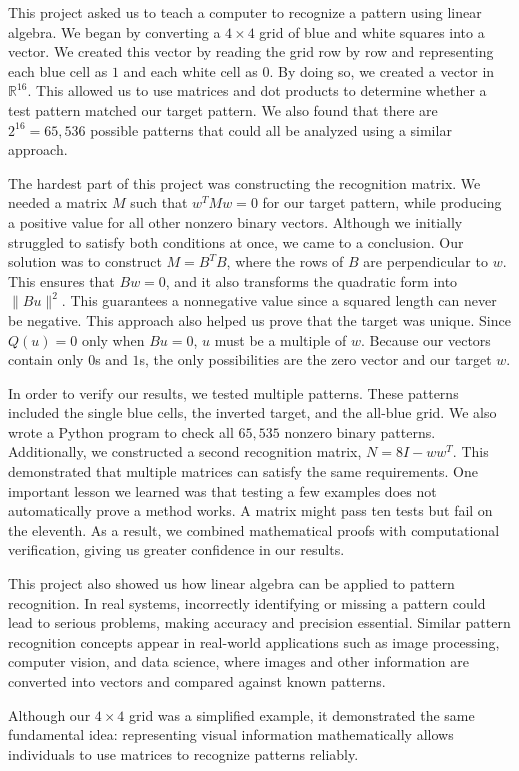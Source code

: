 \documentclass[11pt]{article}
\begin{document}
This project asked us to teach a computer to recognize a pattern using linear algebra. We began by converting a $4\times4$ grid of blue and white squares into a vector. We created this vector by reading the grid row by row and representing each blue cell as $1$ and each white cell as $0$. By doing so, we created a vector in $\mathbb{R}^{16}$. This allowed us to use matrices and dot products to determine whether a test pattern matched our target pattern. We also found that there are $2^{16}=65{,}536$ possible patterns that could all be analyzed using a similar approach.

The hardest part of this project was constructing the recognition matrix. We needed a matrix $M$ such that $w^TMw=0$ for our target pattern, while producing a positive value for all other nonzero binary vectors. Although we initially struggled to satisfy both conditions at once, we came to a conclusion. Our solution was to construct $M=B^TB$, where the rows of $B$ are perpendicular to $w$. This ensures that $Bw=0$, and it also transforms the quadratic form into $\|Bu\|^2$. This guarantees a nonnegative value since a squared length can never be negative. This approach also helped us prove that the target was unique. Since $Q(u)=0$ only when $Bu=0$, $u$ must be a multiple of $w$. Because our vectors contain only $0$s and $1$s, the only possibilities are the zero vector and our target $w$.

In order to verify our results, we tested multiple patterns. These patterns included the single blue cells, the inverted target, and the all-blue grid. We also wrote a Python program to check all $65{,}535$ nonzero binary patterns. Additionally, we constructed a second recognition matrix, $N=8I-ww^T$. This demonstrated that multiple matrices can satisfy the same requirements. One important lesson we learned was that testing a few examples does not automatically prove a method works. A matrix might pass ten tests but fail on the eleventh. As a result, we combined mathematical proofs with computational verification, giving us greater confidence in our results.

This project also showed us how linear algebra can be applied to pattern recognition. In real systems, incorrectly identifying or missing a pattern could lead to serious problems, making accuracy and precision essential. Similar pattern recognition concepts appear in real-world applications such as image processing, computer vision, and data science, where images and other information are converted into vectors and compared against known patterns.

Although our $4\times4$ grid was a simplified example, it demonstrated the same fundamental idea: representing visual information mathematically allows individuals to use matrices to recognize patterns reliably.


\vspace{1.5em}

\end{document}
